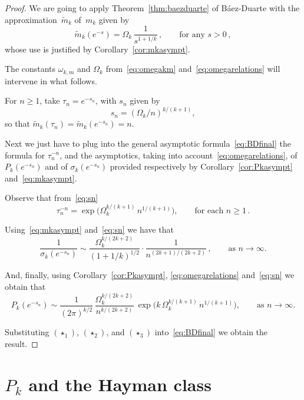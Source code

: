 \documentclass[12pt]{amsart}
\theoremstyle{definition}
\begin{document}
\begin{proof}
We are going to apply Theorem~\ref{thm:baezduarte} of Báez-Duarte with the approximation~$\tilde{m}_k$ of~$m_k$ given by
\[
\tilde{m}_k(e^{-s}) = \Omega_k\,\frac{1}{s^{1+1/k}}\,, \qquad \text{for any } s>0\,,
\]
whose use is justified by Corollary~\ref{cor:mkasympt}.

The constants $\omega_{k,m}$ and $\Omega_k$ from~\eqref{eq:omegakm} and~\eqref{eq:omegarelations} will intervene in what follows.

For $n\ge 1$, take $\tau_n = e^{-s_n}$, with $s_n$ given by
\begin{equation}\label{eq:sn}
s_n = (\Omega_k/n)^{k/(k+1)},
\end{equation}
so that $\tilde{m}_k(\tau_n) = \tilde{m}_k(e^{-s_n}) = n$.
\smallskip

Next we just have to plug into the general asymptotic formula~\eqref{eq:BDfinal} the formula for
$\tau_n^{-n}$, and the asymptotics, taking into account~\eqref{eq:omegarelations}, of $P_k(e^{-s_n})$ and of $\sigma_k(e^{-s_n})$ provided
respectively by Corollary~\ref{cor:Pkasympt} and~\eqref{eq:mkasympt}.

Observe that from~\eqref{eq:sn}
\begin{equation}\tag{$\star_1$}
\tau_n^{-n} = \exp\!\Big(\Omega_k^{k/(k+1)}\, n^{1/(k+1)}\Big), \qquad \text{for each } n\ge 1\,.
\end{equation}

Using~\eqref{eq:mkasympt} and~\eqref{eq:sn} we have that
\begin{equation}\tag{$\star_2$}
\frac{1}{\sigma_k(e^{-s_n})} \sim \frac{\Omega_k^{k/(2k+2)}}{(1+1/k)^{1/2}} \cdot \frac{1}{n^{(2k+1)/(2k+2)}}\,, \qquad \text{as } n\to\infty.
\end{equation}

And, finally, using Corollary~\ref{cor:Pkasympt}, \eqref{eq:omegarelations} and~\eqref{eq:sn} we obtain that
\begin{equation}\tag{$\star_3$}
P_k(e^{-s_n}) \sim \frac{1}{(2\pi)^{k/2}}\, \frac{\Omega_k^{k/(2k+2)}}{n^{k/(2k+2)}}\, \exp\!\Big(k\,\Omega_k^{k/(k+1)}\, n^{1/(k+1)}\Big), \qquad \text{as } n\to\infty.
\end{equation}

Substituting $(\star_1)$, $(\star_2)$, and $(\star_3)$ into~\eqref{eq:BDfinal} we obtain the result.
\end{proof}


\section{$P_k$ and the Hayman class}\label{sec:Hayman}
\end{document}
